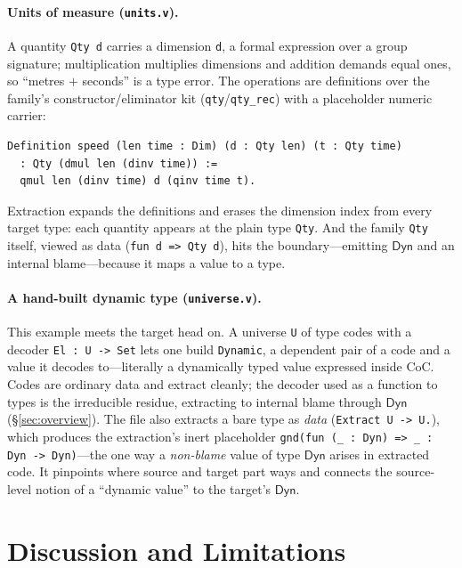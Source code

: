 \documentclass[acmsmall,anonymous=false,nonacm]{acmart}
\newcommand{\dyn}{\ensuremath{\mathsf{Dyn}}}
\begin{document}
\paragraph{Units of measure (\texttt{units.v}).}
A quantity \texttt{Qty d} carries a dimension \texttt{d}, a formal expression
over a group signature; multiplication multiplies dimensions and addition
demands equal ones, so ``metres $+$ seconds'' is a type error. The operations
are definitions over the family's constructor/eliminator kit
(\texttt{qty}/\texttt{qty\_rec}) with a placeholder numeric carrier:
\begin{lstlisting}
Definition speed (len time : Dim) (d : Qty len) (t : Qty time)
  : Qty (dmul len (dinv time)) :=
  qmul len (dinv time) d (qinv time t).
\end{lstlisting}
Extraction expands the definitions and erases the dimension index from every
target type: each quantity appears at the plain type \texttt{Qty}. And the
family \texttt{Qty} itself, viewed as data (\texttt{fun d => Qty d}), hits the
boundary---emitting $\dyn$ and an internal blame---because it maps a value to
a type.

\paragraph{A hand-built dynamic type (\texttt{universe.v}).}
This example meets the target head on. A universe \texttt{U} of type codes
with a decoder \texttt{El : U -> Set} lets one build \texttt{Dynamic}, a
dependent pair of a code and a value it decodes to---literally a dynamically
typed value expressed inside CoC. Codes are ordinary data and extract
cleanly; the decoder used as a function to types is the irreducible residue,
extracting to internal blame through $\dyn$ (\S\ref{sec:overview}). The file
also extracts a bare type as \emph{data} (\texttt{Extract U -> U.}), which
produces the extraction's inert placeholder
\texttt{gnd(fun (\_ : Dyn) => \_ : Dyn -> Dyn)}---the one way a
\emph{non-blame} value of type $\dyn$ arises in extracted code. It pinpoints
where source and target part ways and connects the source-level notion of a
``dynamic value'' to the target's $\dyn$.

\section{Discussion and Limitations}\label{sec:limitations}
\end{document}
